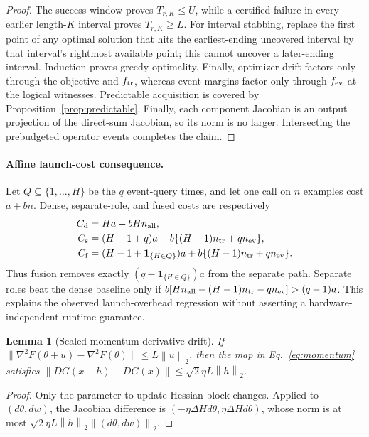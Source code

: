 \documentclass{article}
\newtheorem{lemma}{Lemma}
\newcommand{\norm}[1]{\left\lVert #1\right\rVert_2}
\begin{document}
\begin{proof}
The success window proves $T_{r,K}\le U$, while a certified failure in every
earlier length-$K$ interval proves $T_{r,K}\ge L$.  For interval stabbing,
replace the first point of any optimal solution that hits the earliest-ending
uncovered interval by that interval's rightmost available point; this cannot
uncover a later-ending interval.  Induction proves greedy optimality.  Finally,
optimizer drift factors only through the objective and $f_{\rm tr}$, whereas
event margins factor only through $f_{\rm ev}$ at the logical witnesses.
Predictable acquisition is covered by Proposition~\ref{prop:predictable}.
Finally, each component Jacobian is an output projection of the direct-sum
Jacobian, so its norm is no larger.  Intersecting the prebudgeted operator
events completes the claim.
\end{proof}

\paragraph{Affine launch-cost consequence.}
Let $Q\subseteq\{1,\ldots,H\}$ be the $q$ event-query times, and let one call
on $n$ examples cost $a+bn$.  Dense, separate-role, and fused costs are
respectively
\begin{align*}
C_{\rm d}&=Ha+bHn_{\rm all},\\
C_{\rm s}&=(H-1+q)a+b\{(H-1)n_{\rm tr}+qn_{\rm ev}\},\\
C_{\rm f}&=(H-1+\mathbf1_{\{H\in Q\}})a
 +b\{(H-1)n_{\rm tr}+qn_{\rm ev}\}.
\end{align*}
Thus fusion removes exactly
$(q-\mathbf1_{\{H\in Q\}})a$ from the separate path.  Separate roles beat
the dense baseline only if
$b[Hn_{\rm all}-(H-1)n_{\rm tr}-qn_{\rm ev}]>(q-1)a$.
This explains the observed launch-overhead regression without asserting a
hardware-independent runtime guarantee.

\begin{lemma}[Scaled-momentum derivative drift]
If $\lVert\nabla^2F(\theta+u)-\nabla^2F(\theta)\rVert\le L\norm{u}$, then the
map in Eq.~\eqref{eq:momentum} satisfies
$\lVert DG(x+h)-DG(x)\rVert\le\sqrt2\eta L\norm{h}$.
\end{lemma}

\begin{proof}
Only the parameter-to-update Hessian block changes.  Applied to
$(d\theta,dw)$, the Jacobian difference is
$(-\eta\Delta H d\theta,\eta\Delta H d\theta)$, whose norm is at most
$\sqrt2\eta L\norm{h}\norm{(d\theta,dw)}$.
\end{proof}
\end{document}
